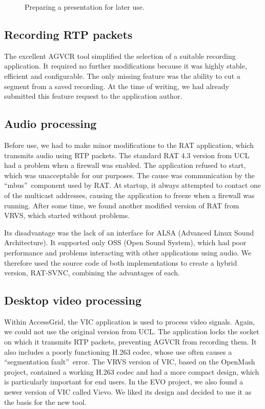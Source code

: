 \begin{figure}
\centering

\caption{Preparing a presentation for later use.}
\label{fig:LocalhostRecording}
\end{figure}

\subsection{Recording RTP packets}
The excellent AGVCR tool simplified the selection of a suitable recording application. It required no further modifications because it was highly stable, efficient and configurable. The only missing feature was the ability to cut a segment from a saved recording. At the time of writing, we had already submitted this feature request to the application author.

\subsection{Audio processing}\label{kap:HybridRAT}
Before use, we had to make minor modifications to the RAT application, which transmits audio using RTP packets. The standard RAT 4.3 version from UCL had a problem when a firewall was enabled. The application refused to start, which was unacceptable for our purposes. The cause was communication by the \textquotedblleft mbus\textquotedblright\ component used by RAT. At startup, it always attempted to contact one of the multicast addresses, causing the application to freeze when a firewall was running. After some time, we found another modified version of RAT from VRVS, which started without problems.

Its disadvantage was the lack of an interface for ALSA (Advanced Linux Sound Architecture). It supported only OSS (Open Sound System), which had poor performance and problems interacting with other applications using audio. We therefore used the source code of both implementations to create a hybrid version, RAT-SVNC, combining the advantages of each.

\subsection{Desktop video processing}
Within AccessGrid, the VIC application is used to process video signals. Again, we could not use the original version from UCL. The application locks the socket on which it transmits RTP packets, preventing AGVCR from recording them. It also includes a poorly functioning H.263 codec, whose use often causes a \textquotedblleft segmentation fault\textquotedblright\ error. The VRVS version of VIC, based on the OpenMash project, contained a working H.263 codec and had a more compact design, which is particularly important for end users. In the EVO project, we also found a newer version of VIC called Vievo. We liked its design and decided to use it as the basis for the new tool.

